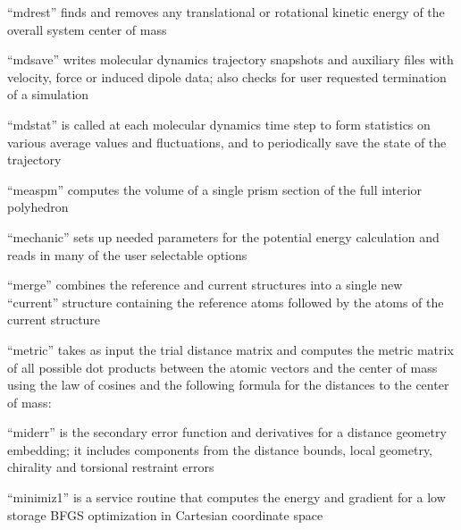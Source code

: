 \documentclass[letterpaper,11pt,english]{sphinxmanual}
\begin{document}

“mdrest” finds and removes any translational or rotational
kinetic energy of the overall system center of mass


“mdsave” writes molecular dynamics trajectory snapshots and
auxiliary files with velocity, force or induced dipole data;
also checks for user requested termination of a simulation


“mdstat” is called at each molecular dynamics time step to
form statistics on various average values and fluctuations,
and to periodically save the state of the trajectory





“measpm” computes the volume of a single prism section of
the full interior polyhedron


“mechanic” sets up needed parameters for the potential energy
calculation and reads in many of the user selectable options


“merge” combines the reference and current structures into
a single new “current” structure containing the reference
atoms followed by the atoms of the current structure


“metric” takes as input the trial distance matrix and computes
the metric matrix of all possible dot products between the atomic
vectors and the center of mass using the law of cosines and the
following formula for the distances to the center of mass:


“miderr” is the secondary error function and derivatives
for a distance geometry embedding; it includes components
from the distance bounds, local geometry, chirality and
torsional restraint errors


“minimiz1” is a service routine that computes the energy and
gradient for a low storage BFGS optimization in Cartesian
coordinate space
\end{document}
